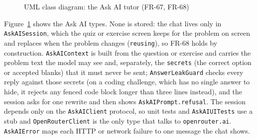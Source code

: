 \documentclass[12pt,letterpaper]{article}
\newcommand{\st}[1]{\guillemotleft#1\guillemotright}   %
\newcommand{\ctitle}[1]{{\centering #1\par}}   %
\begin{document}
\begin{figure}[!htbp]
{}
\caption{UML class diagram: the Ask AI tutor (FR-67, FR-68)}
\label{fig:askai-classes}
\end{figure}

Figure~\ref{fig:askai-classes} shows the Ask AI types. None is stored: the chat lives
only in \texttt{AskAISession}, which the quiz or exercise screen keeps for the problem
on screen and replaces when the problem changes (\texttt{reusing}), so FR-68 holds by
construction. \texttt{AskAIContext} is built from the question or exercise and carries
the problem text the model may see and, separately, the \texttt{secrets} (the correct
option or accepted blanks) that it must never be sent; \texttt{AnswerLeakGuard} checks
every reply against those secrets (on a coding challenge, which has no single answer to
hide, it rejects any fenced code block longer than three lines instead), and the session asks for one rewrite and then shows
\texttt{AskAIPrompt.refusal}. The session depends only on the \texttt{AskAIClient}
protocol, so unit tests and \texttt{AskAIUITests} use a stub and
\texttt{OpenRouterClient} is the only type that talks to \texttt{openrouter.ai}.
\texttt{AskAIError} maps each HTTP or network failure to one message the chat shows.
\end{document}
